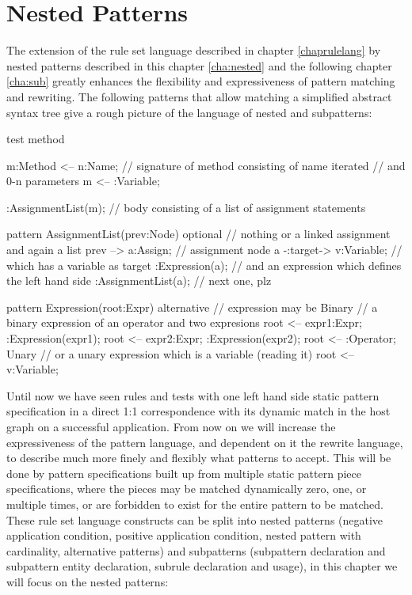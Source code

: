 \chapter{Nested Patterns}
\label{cha:nested}

The extension of the rule set language described in chapter \ref{chaprulelang} by nested patterns described in this chapter \ref{cha:nested} and the following chapter \ref{cha:sub} greatly enhances the flexibility and expressiveness of pattern matching and rewriting.
The following patterns that allow matching a simplified abstract syntax tree give a rough picture of the language of nested and subpatterns:
  \begin{example} \label{ex:proggraph}
    \begin{grgen}
test method
{
  m:Method <-- n:Name; // signature of method consisting of name
  iterated { // and 0-n parameters
    m <-- :Variable;
  }  
  
  :AssignmentList(m); // body consisting of a list of assignment statements
}

pattern AssignmentList(prev:Node)
{
  optional { // nothing or a linked assignment and again a list
    prev --> a:Assign; // assignment node 
    a -:target-> v:Variable; // which has a variable as target 
    :Expression(a);  // and an expression which defines the left hand side 
    :AssignmentList(a); // next one, plz
  }
}

pattern Expression(root:Expr)
{
  alternative { // expression may be
    Binary { // a binary expression of an operator and two expresions
      root <-- expr1:Expr;
      :Expression(expr1);
      root <-- expr2:Expr;
      :Expression(expr2);
      root <-- :Operator;
    }
    Unary { // or a unary expression which is a variable (reading it)
      root <-- v:Variable;
    }
  }
}
    \end{grgen}
  \end{example}\label{introexample}


Until now we have seen rules and tests with one left hand side static pattern specification in a direct 1:1 correspondence with its dynamic match in the host graph on a successful application.
From now on we will increase the expressiveness of the pattern language, and dependent on it the rewrite language, to describe much more finely and flexibly what patterns to accept.
This will be done by pattern specifications built up from multiple static pattern piece specifications, where the pieces may be matched dynamically zero, one, or multiple times, or are forbidden to exist for the entire pattern to be matched.
These rule set language constructs can be split into nested patterns (negative application condition, positive application condition, nested pattern with cardinality, alternative patterns) and subpatterns (subpattern declaration and subpattern entity declaration, subrule declaration and usage), in this chapter we will focus on the nested patterns:

